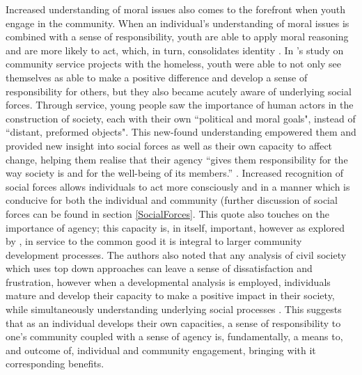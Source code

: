 Increased understanding of moral issues also comes to the forefront when youth engage in the community. When an individual's understanding of moral issues is combined with a sense of responsibility, youth are able to apply moral reasoning and are more likely to act, which, in turn, consolidates identity \citep{VanGoethem2012}. In \citet{Youniss1997}'s study on community service projects with the homeless, youth were able to not only see themselves as able to make a positive difference and develop a sense of responsibility for others, but they also became acutely aware of underlying social forces. Through service, young people saw the importance of human actors in the construction of society, each with their own “political and moral goals", instead of “distant, preformed objects". This new-found understanding empowered them and provided new insight into social forces as well as their own capacity to affect change, helping them realise that their agency “gives them responsibility for the way society is and for the well-being of its members.” \citep[][p625, see also \citealp{Youniss1997b}]{Youniss1997}. Increased recognition of social forces allows individuals to act more consciously and in a manner which is conducive for both the individual and community (further discussion of social forces can be found in section \ref{SocialForces}. This quote also touches on the importance of agency; this capacity is, in itself, important, however as explored by \citet[][]{Youniss1999a}, in service to the common good it is integral to larger community development processes. The authors also noted that any analysis of civil society which uses top down approaches can leave a sense of dissatisfaction and frustration, however when a developmental analysis is employed, individuals mature and develop their capacity to make a positive impact in their society, while simultaneously understanding underlying social processes \citep{Youniss1997}. This suggests that as an individual develops their own capacities, a sense of responsibility to one's community coupled with a sense of agency is, fundamentally, a means to, and outcome of, individual and community engagement, bringing with it corresponding benefits.

